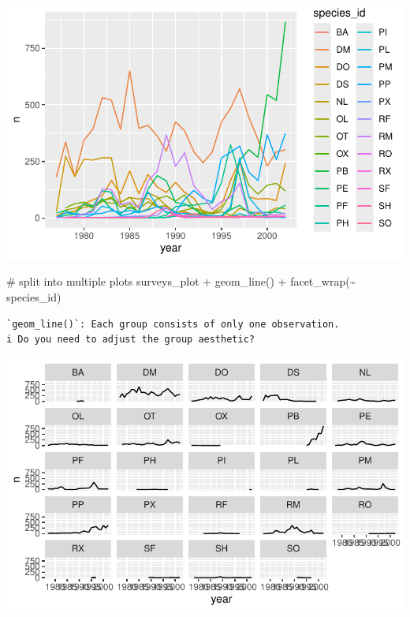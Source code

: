 \documentclass[
  letterpaper,
  DIV=11,
  numbers=noendperiod]{scrreprt}
\newenvironment{Shaded}{\begin{snugshade}}{\end{snugshade}}
\newcommand{\CommentTok}[1]{\textcolor[rgb]{0.37,0.37,0.37}{#1}}
\newcommand{\FunctionTok}[1]{\textcolor[rgb]{0.28,0.35,0.67}{#1}}
\newcommand{\NormalTok}[1]{\textcolor[rgb]{0.00,0.23,0.31}{#1}}
\newcommand{\SpecialCharTok}[1]{\textcolor[rgb]{0.37,0.37,0.37}{#1}}
\begin{document}
\includegraphics{src/notebooks/r_files/figure-pdf/unnamed-chunk-45-3.pdf}

\begin{Shaded}
\begin{Highlighting}[]
\CommentTok{\# split into multiple plots}
\NormalTok{surveys\_plot }\SpecialCharTok{+} \FunctionTok{geom\_line}\NormalTok{() }\SpecialCharTok{+} \FunctionTok{facet\_wrap}\NormalTok{(}\SpecialCharTok{\textasciitilde{}}\NormalTok{ species\_id)}
\end{Highlighting}
\end{Shaded}

\begin{verbatim}
`geom_line()`: Each group consists of only one observation.
i Do you need to adjust the group aesthetic?
\end{verbatim}

\includegraphics{src/notebooks/r_files/figure-pdf/unnamed-chunk-45-4.pdf}
\end{document}
